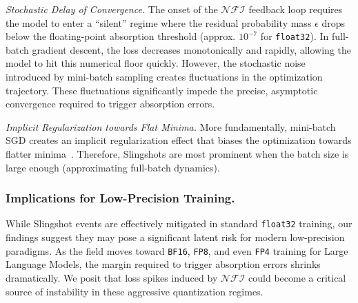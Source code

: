 \documentclass{article}
\theoremstyle{plain}
\theoremstyle{definition}
\theoremstyle{remark}
\begin{document}
\emph{Stochastic Delay of Convergence.}
The onset of the $\mathcal{NFI}$ feedback loop requires the model to enter a ``silent'' regime where the residual probability mass $\epsilon$ drops below the floating-point absorption threshold (approx. $10^{-7}$ for \texttt{float32}). In full-batch gradient descent, the loss decreases monotonically and rapidly, allowing the model to hit this numerical floor quickly. 
However, the stochastic noise introduced by mini-batch sampling creates fluctuations in the optimization trajectory. These fluctuations significantly impede the precise, asymptotic convergence required to trigger absorption errors. 

\emph{Implicit Regularization towards Flat Minima.}
More fundamentally, mini-batch SGD creates an implicit regularization effect that biases the optimization towards flatter minima~\cite{keskar2017, smith2018}. 
Therefore, Slingshots are most prominent when the batch size is large enough (approximating full-batch dynamics).
\subsubsection{Implications for Low-Precision Training.}
While Slingshot events are effectively mitigated in standard \texttt{float32} training, 
our findings suggest they may pose a significant latent risk for modern low-precision paradigms. 
As the field moves toward \texttt{BF16}, \texttt{FP8}, and even \texttt{FP4} training for Large Language Models, 
the margin required to trigger absorption errors shrinks dramatically. 
We posit that loss spikes induced by $\mathcal{NFI}$ could become a critical source of instability in these aggressive quantization regimes.
\end{document}
